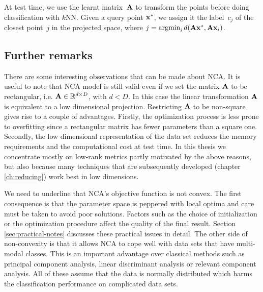 	At test time, we use the learnt matrix~$\mathbf{A}$ to transform the points before doing classification with $k$NN. Given a query point $\mathbf{x}^*$, we assign it the label~$c_j$ of the closest point~$j$ in the projected space, where $j = \operatorname{argmin}_{i}d(\mathbf{A}\mathbf{x}^*,\mathbf{A}\mathbf{x}_i)$.

	\subsection*{Further remarks}
	
	There are some interesting observations that can be made about NCA. It is useful to note that NCA model is still valid even if we set the matrix $\mathbf{A}$ to be rectangular, i.e. $\mathbf{A}\in\mathbb{R}^{d\times D}$, with $d<D$. In this case the linear transformation $\mathbf{A}$ is equivalent to a low dimensional projection. Restricting $\mathbf{A}$ to be non-square gives rise to a couple of advantages. Firstly, the optimization process is less prone to overfitting since a rectangular matrix has fewer parameters than a square one. Secondly, the low dimensional representation of the data set reduces the memory requirements and the computational cost at test time. In this thesis we concentrate mostly on low-rank metrics partly motivated by the above reasons, but also because many techniques that are subsequently developed (chapter \ref{ch:reducing}) work best in low dimensions.


	We need to underline that NCA's objective function is not convex. The first consequence is that the parameter space is peppered with local optima and care must be taken to avoid poor solutions. Factors such as the choice of initialization or the optimization procedure affect the quality of the final result. Section \ref{sec:practical-notes} discusses these practical issues in detail. The other side of non-convexity is that it allows NCA to cope well with data sets that have multi-modal classes. This is an important advantage over classical methods such as principal component analysis, linear discriminant analysis or relevant component analysis. All of these assume that the data is normally distributed which harms the classification performance on complicated data sets.

